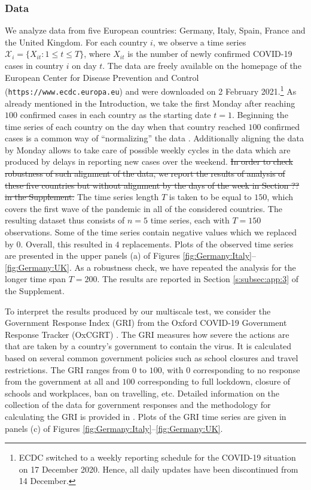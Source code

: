 \documentclass[a4paper,12pt]{article}
\numberwithin{equation}{section}
\begin{document}
\subsubsection{Data}


We analyze data from five European countries: Germany, Italy, Spain, France and the United Kingdom. For each country $i$, we observe a time series $\mathcal{X}_i = \{ X_{it}: 1 \le t \le T \}$, where $X_{it}$ is the number of newly confirmed COVID-19 cases in country $i$ on day $t$. The data are freely available on the homepage of the European Center for Disease Prevention and Control (\texttt{https://www.ecdc.europa.eu}) and were downloaded on {\color{blue}2 February 2021}.\footnote{\color{blue} ECDC switched to a weekly reporting schedule for the COVID-19 situation on 17 December 2020. Hence, all daily updates have been discontinued from 14 December.} {\color{red} As already mentioned in the Introduction, we take the first Monday after reaching $100$ confirmed cases in each country as the starting date $t=1$. Beginning the time series of each country on the day when that country reached $100$ confirmed cases is a common way of ``normalizing'' the data \citep[e.g.][]{Cohen2020}. Additionally aligning the data by Monday allows to take care of possible weekly cycles in the data which are produced by delays in reporting new cases over the weekend. \sout{In order to check robustness of such alignment of the data, we report the results of analysis of these five countries but without alignment by the days of the week in Section ?? in the Supplement.} The time series length $T$ is taken to be equal to $150$, which covers the first wave of the pandemic in all of the considered countries. The resulting dataset thus consists of $n = 5$ time series, each with $T = 150$ observations. Some of the time series contain negative values which we replaced by $0$. Overall, this resulted in {\color{red}$4$} replacements. Plots of the observed time series are presented in the upper panels (a) of Figures \ref{fig:Germany:Italy}--\ref{fig:Germany:UK}. As a robustness check, we have repeated the analysis for the longer time span $T=200$. The results are reported in Section \ref{s:subsec:app:3} of the Supplement.}


To interpret the results produced by our multiscale test, we consider the Government Response Index (GRI) from the Oxford COVID-19 Government Response Tracker (OxCGRT) \citep{Hale2020}. The GRI measures how severe the actions are that are taken by a country's government to contain the virus. It is calculated based on several common government policies such as school closures and travel restrictions. The GRI ranges from $0$ to $100$, with $0$ corresponding to no response from the government at all and $100$ corresponding to full lockdown, closure of schools and workplaces, ban on travelling, etc. Detailed information on the collection of the data for government responses and the methodology for calculating the GRI is provided in \cite{Hale2020paper}. Plots of the GRI time series are given in panels (c) of Figures \ref{fig:Germany:Italy}--\ref{fig:Germany:UK}.
\end{document}
